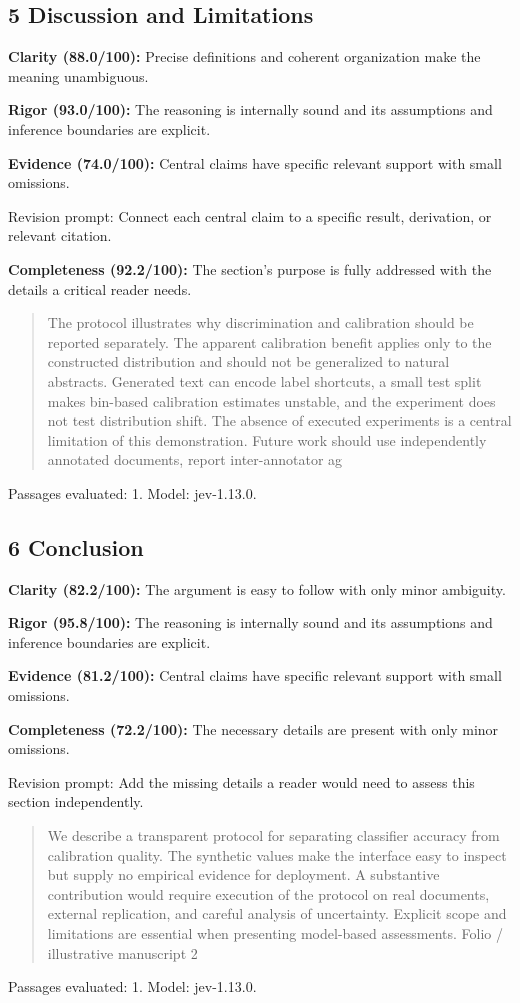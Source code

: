 \documentclass[11pt]{article}
\begin{document}
\subsection{5 Discussion and Limitations}
\par\textbf{Clarity (88.0/100):} Precise definitions and coherent organization make the meaning unambiguous.
\par\textbf{Rigor (93.0/100):} The reasoning is internally sound and its assumptions and inference boundaries are explicit.
\par\textbf{Evidence (74.0/100):} Central claims have specific relevant support with small omissions.
\par Revision prompt: Connect each central claim to a specific result, derivation, or relevant citation.
\par\textbf{Completeness (92.2/100):} The section's purpose is fully addressed with the details a critical reader needs.
\begin{quote}\small The protocol illustrates why discrimination and calibration should be reported separately. The apparent
calibration benefit applies only to the constructed distribution and should not be generalized to natural
abstracts. Generated text can encode label shortcuts, a small test split makes bin-based calibration
estimates unstable, and the experiment does not test distribution shift. The absence of executed
experiments is a central limitation of this demonstration. Future work should use independently
annotated documents, report inter-annotator ag\end{quote}
Passages evaluated: 1. Model: jev-1.13.0.
\subsection{6 Conclusion}
\par\textbf{Clarity (82.2/100):} The argument is easy to follow with only minor ambiguity.
\par\textbf{Rigor (95.8/100):} The reasoning is internally sound and its assumptions and inference boundaries are explicit.
\par\textbf{Evidence (81.2/100):} Central claims have specific relevant support with small omissions.
\par\textbf{Completeness (72.2/100):} The necessary details are present with only minor omissions.
\par Revision prompt: Add the missing details a reader would need to assess this section independently.
\begin{quote}\small We describe a transparent protocol for separating classifier accuracy from calibration quality. The
synthetic values make the interface easy to inspect but supply no empirical evidence for deployment. A
substantive contribution would require execution of the protocol on real documents, external replication,
and careful analysis of uncertainty. Explicit scope and limitations are essential when presenting
model-based assessments.
Folio / illustrative manuscript                                      2\end{quote}
Passages evaluated: 1. Model: jev-1.13.0.
\end{document}
